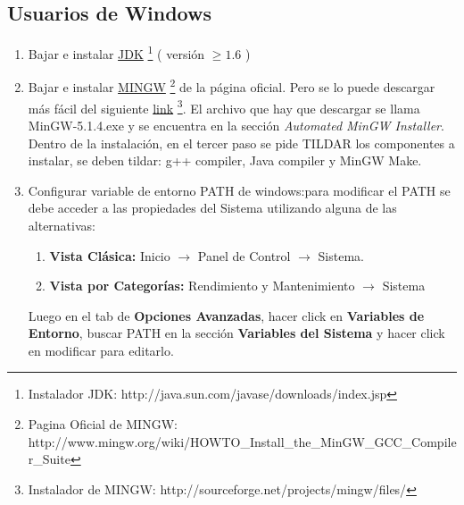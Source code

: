 \documentclass[11pt,a4paper]{article}
\begin{document}
\subsection{Usuarios de Windows}
	\begin{enumerate}
	\item Bajar e instalar \href{http://java.sun.com/javase/downloads/index.jsp}{JDK}
	\footnote{Instalador JDK: http://java.sun.com/javase/downloads/index.jsp} ( versión \begin{math}\geq 1.6\end{math} )
	\item Bajar e instalar \href{http://www.mingw.org/wiki/HOWTO_Install_the_MinGW_GCC_Compiler_Suite}{MINGW}
	\footnote{Pagina Oficial de MINGW: http://www.mingw.org/wiki/HOWTO\_Install\_the\_MinGW\_GCC\_Compiler\_Suite}
	 de la página oficial.
	Pero se lo puede descargar más fácil del siguiente \href{http://sourceforge.net/projects/mingw/files/}{link}
	\footnote{Instalador de MINGW: http://sourceforge.net/projects/mingw/files/}.
El archivo que hay que descargar se llama MinGW-5.1.4.exe y  se encuentra en la sección {\it Automated MinGW Installer}.
Dentro de la instalación, en el tercer paso se pide TILDAR los componentes a instalar, se deben tildar: g++ compiler, Java compiler y MinGW Make.
\item Configurar variable de entorno PATH de windows:para modificar el PATH se debe acceder a  las propiedades del Sistema utilizando alguna de las alternativas:
	\begin{enumerate}
		\item {\bf Vista Clásica:} Inicio \begin{math}\to\end{math} Panel de Control \begin{math}\to\end{math} Sistema.
		\item {\bf Vista por Categorías:} Rendimiento y Mantenimiento \begin{math}\to\end{math} Sistema
	\end{enumerate}

   Luego en el tab  de {\bf Opciones Avanzadas}, hacer click en {\bf Variables de Entorno}, buscar PATH en la sección
        {\bf Variables del Sistema} y hacer click en modificar para editarlo.
        

\end{enumerate}
\end{document}
